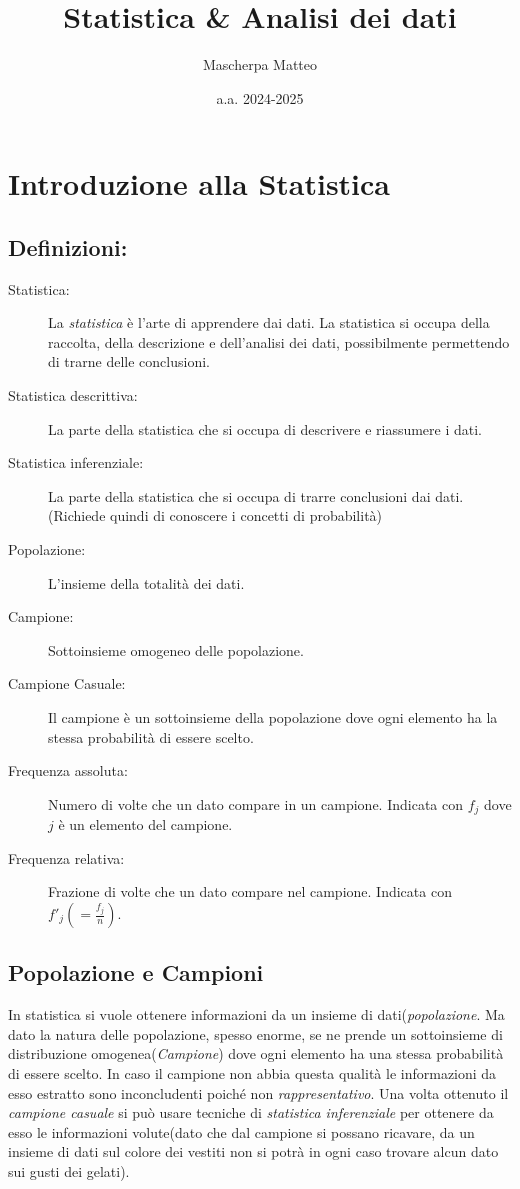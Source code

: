 \documentclass{article}
\title{Statistica \& Analisi dei dati}
\author{Mascherpa Matteo}
\date{a.a. 2024-2025}
\begin{document}
\maketitle

\tableofcontents

\section{Introduzione alla Statistica}
  \subsection{Definizioni:}
    \begin{description}
      \item[Statistica:] La \textit{statistica} è l'arte di apprendere dai dati. La statistica si occupa della raccolta, della descrizione e dell'analisi dei dati, possibilmente permettendo di trarne delle conclusioni.
      \item[Statistica descrittiva:] La parte della statistica che si occupa di descrivere e riassumere i dati.
      \item[Statistica inferenziale:] La parte della statistica che si occupa di trarre conclusioni dai dati. (Richiede quindi di conoscere i concetti di probabilità)
      \item[Popolazione:] L'insieme della totalità dei dati.
      \item[Campione:] Sottoinsieme omogeneo delle popolazione. 
      \item[Campione Casuale:] Il campione è un sottoinsieme della popolazione dove ogni elemento ha la stessa probabilità di essere scelto.
      \item[Frequenza assoluta:] Numero di volte che un dato compare in un campione. Indicata con $f_j$ dove $j$ è un elemento del campione.
      \item[Frequenza relativa:] Frazione di volte che un dato compare nel campione. Indicata con $f'_j (= \frac{f_j}{n})$.
    \end{description}

  \subsection{Popolazione e Campioni}
    In statistica si vuole ottenere informazioni da un insieme di dati(\textit{popolazione}. Ma dato la natura delle popolazione, spesso enorme, se ne prende un sottoinsieme di distribuzione omogenea(\textit{Campione}) dove ogni elemento ha una stessa probabilità di essere scelto. In caso il campione non abbia questa qualità le informazioni da esso estratto sono inconcludenti poiché non \textit{rappresentativo}. Una volta ottenuto il \textit{campione casuale} si può usare tecniche di \textit{statistica inferenziale} per ottenere da esso le informazioni volute(dato che dal campione si possano ricavare, da un insieme di dati sul colore dei vestiti non si potrà in ogni caso trovare alcun dato sui gusti dei gelati). 
  
\end{document}
